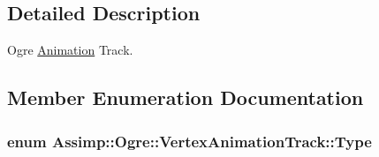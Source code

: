 \subsection{Detailed Description}
Ogre \hyperlink{class_assimp_1_1_ogre_1_1_animation}{Animation} Track. 

\subsection{Member Enumeration Documentation}
\hypertarget{struct_assimp_1_1_ogre_1_1_vertex_animation_track_a37591fc343c62d6911905ed23306f5e9}{
\subsubsection[{Type}]{\setlength{\rightskip}{0pt plus 5cm}enum {\bf Assimp\+::\+Ogre\+::\+Vertex\+Animation\+Track\+::\+Type}}}\label{struct_assimp_1_1_ogre_1_1_vertex_animation_track_a37591fc343c62d6911905ed23306f5e9}
